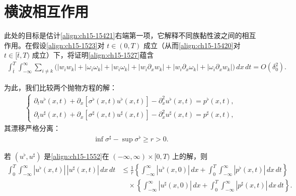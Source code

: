 \documentclass[../../main.tex]{subfiles}
\begin{document}
\section{横波相互作用}\label{section:ch15-横波相互作用}

此处的目标是估计\eqref{align:ch15-15421}右端第一项，它解释不同族黏性波之间的相互作用。在假设\eqref{align:ch15-1523}对 $t\in(0,T)$ 成立（从而\eqref{align:ch15-15420}对 $t\in[\bar t,T)$ 成立）下，将证明\eqref{align:ch15-1527}蕴含
\begin{align}
\int_{\bar t}^{T}\int_{-\infty}^{\infty}\sum_{i\neq k}\bigl(|w_iw_k|+|\omega_i\omega_k|+|w_i\omega_k|+|w_i\partial_xw_k|+|w_i\partial_x\omega_k|+|\omega_i\partial_xw_k|\bigr)\,dx\,dt=O(\delta_0^2).
\label{align:ch15-1551}
\end{align}

为此，我们比较两个抛物方程的解：
\begin{align}
\begin{cases}
\partial_tu^\flat(x,t)+\partial_x\left[\sigma^\flat(x,t)u^\flat(x,t)\right]-\partial_x^2u^\flat(x,t)=p^\flat(x,t),\\
\partial_tu^\sharp(x,t)+\partial_x\left[\sigma^\sharp(x,t)u^\sharp(x,t)\right]-\partial_x^2u^\sharp(x,t)=p^\sharp(x,t),
\end{cases}
\label{align:ch15-1552}
\end{align}
其漂移严格分离：
\begin{align}
\inf\sigma^\sharp-\sup\sigma^\flat\geqslant r>0.
\label{align:ch15-1553}
\end{align}

\begin{lemma}\label{lemma:ch15-横波相互作用估计}
若 $(u^\flat,u^\sharp)$ 是\eqref{align:ch15-1552}在 $(-\infty,\infty)\times[0,T)$ 上的解，则
\begin{align}
\int_0^T\int_{-\infty}^{\infty}|u^\flat(x,t)|\,|u^\sharp(x,t)|\,dx\,dt&\leqslant\frac1r\left\{\int_{-\infty}^{\infty}|u^\flat(x,0)|\,dx+\int_0^T\int_{-\infty}^{\infty}|p^\flat(x,t)|\,dx\,dt\right\}\nonumber\\
&\quad\times\left\{\int_{-\infty}^{\infty}|u^\sharp(x,0)|\,dx+\int_0^T\int_{-\infty}^{\infty}|p^\sharp(x,t)|\,dx\,dt\right\}.
\label{align:ch15-1554}
\end{align}
\end{lemma}
\end{document}
